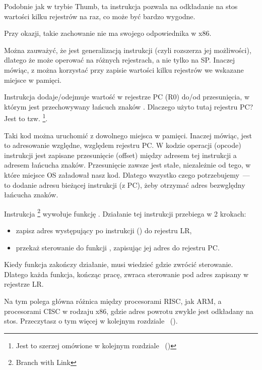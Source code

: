 Podobnie jak \PUSH w trybie Thumb, ta instrukcja pozwala na odkładanie na stos wartości kilku rejestrów na raz, co może być bardzo wygodne.

Przy okazji, takie zachowanie nie ma swojego odpowiednika w x86.

Można zauważyć, że  jest generalizacją instrukcji \PUSH (czyli rozszerza jej możliwości), dlatego że może operować na różnych rejestrach, a nie tylko na \ac{SP}.
Inaczej mówiąc, z  można korzystać przy zapisie wartości kilku rejestrów we wskazane miejsce w pamięci.

\myindex{\PICcode}
Instrukcja  dodaje/odejmuje wartość w rejestrze \ac{PC} (R0) do/od przesunięcia, w którym jest przechowywany łańcuch znaków
.
Dlaczego użyto tutaj rejestru \ac{PC}? Jest to tzw. \q{\PICcode}
\footnote{Jest to szerzej omówione w kolejnym rozdziale ~()}.

Taki kod można uruchomić z dowolnego miejsca w pamięci.
Inaczej mówiąc, jest to adresowanie względne, względem rejestru \ac{PC}.
W kodzie operacji (opcode) instrukcji  jest zapisane przesunięcie (offset) między adresem tej instrukcji a adresem łańcucha znaków.
Przesunięcie zawsze jest stałe, niezależnie od tego, w które miejsce \ac{OS} załadował nasz kod.
Dlatego wszystko czego potrzebujemy~--- to dodanie adresu bieżącej instrukcji (z \ac{PC}), żeby otrzymać adres bezwględny łańcucha znaków.

Instrukcja \footnote{Branch with Link} wywołuje funkcję \printf.
Działanie tej instrukcji przebiega w 2 krokach:

\begin{itemize}
\item zapisz adres występujący po instrukcji  () do rejestru \ac{LR},
\item przekaż sterowanie do funkcji \printf, zapisując jej adres do rejestru \ac{PC}.
\end{itemize}

Kiedy funkcja \printf zakończy działanie, musi wiedzieć gdzie zwrócić sterowanie. Dlatego każda funkcja, kończąc pracę, zwraca sterowanie pod adres zapisany w rejestrze \ac{LR}.

Na tym polega główna różnica między  procesorami \ac{RISC}, jak ARM, a procesorami \ac{CISC} w rodzaju x86,
gdzie adres powrotu zwykle jest odkładany na stos. Przeczytasz o tym więcej w kolejnym rozdziale ~().

